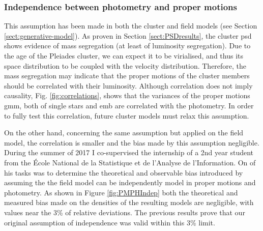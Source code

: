 \subsubsection{Independence between photometry and proper motions}

This assumption has been made in both the cluster and field models (see Section \ref{sect:generative-model}). As proven in Section \ref{sect:PSDresults}, the cluster \gls{psd} shows evidence of mass segregation (at least of luminosity segregation). Due to the age of the Pleiades cluster, we can expect it to be virialised, and thus its space distribution to be coupled with the velocity distribution. Therefore, the mass segregation may indicate that the proper motions of the cluster members should be correlated with their luminosity. Although correlation does not imply causality, Fig. \ref{fig:correlations}, shows that the variances of the proper motions \gls{gmm}, both of single stars and \gls{emb} are correlated with the photometry. In order to fully test this correlation, future cluster models must relax this assumption.

On the other hand, concerning the same assumption but applied on the field model, the correlation is smaller and the bias made by this assumption negligible. During the summer of 2017 I co-supervised the internship of a 2nd year student from the École National de la Statistique et de l'Analyse de l'Information. On of his tasks was to determine the theoretical and observable bias introduced by assuming the the field model can be independently model in proper motions and photometry. As shown in Figure \ref{fig:PMPHIndep} both the theoretical and measured bias made on the densities of the resulting models are negligible, with values near the 3\% of relative deviations. The previous results prove that our original assumption of independence was valid within this 3\% limit.

